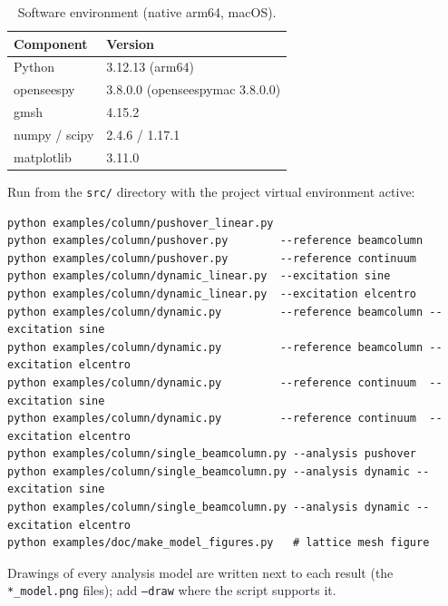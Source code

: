 \documentclass[11pt]{article}
\newcommand{\code}[1]{\texttt{#1}}
\begin{document}
\begin{table}[H]
\centering
\caption{Software environment (native arm64, macOS).}
\begin{tabular}{l l}
\toprule
Component & Version \\
\midrule
Python        & 3.12.13 (arm64) \\
openseespy    & 3.8.0.0 (openseespymac 3.8.0.0) \\
gmsh          & 4.15.2 \\
numpy / scipy & 2.4.6 / 1.17.1 \\
matplotlib    & 3.11.0 \\
\bottomrule
\end{tabular}
\end{table}

Run from the \code{src/} directory with the project virtual environment active:

{\small
\begin{verbatim}
python examples/column/pushover_linear.py
python examples/column/pushover.py        --reference beamcolumn
python examples/column/pushover.py        --reference continuum
python examples/column/dynamic_linear.py  --excitation sine
python examples/column/dynamic_linear.py  --excitation elcentro
python examples/column/dynamic.py         --reference beamcolumn --excitation sine
python examples/column/dynamic.py         --reference beamcolumn --excitation elcentro
python examples/column/dynamic.py         --reference continuum  --excitation sine
python examples/column/dynamic.py         --reference continuum  --excitation elcentro
python examples/column/single_beamcolumn.py --analysis pushover
python examples/column/single_beamcolumn.py --analysis dynamic --excitation sine
python examples/column/single_beamcolumn.py --analysis dynamic --excitation elcentro
python examples/doc/make_model_figures.py   # lattice mesh figure
\end{verbatim}
}

Drawings of every analysis model are written next to each result (the \code{*\_model.png} files);
add \code{--draw} where the script supports it.
\end{document}
